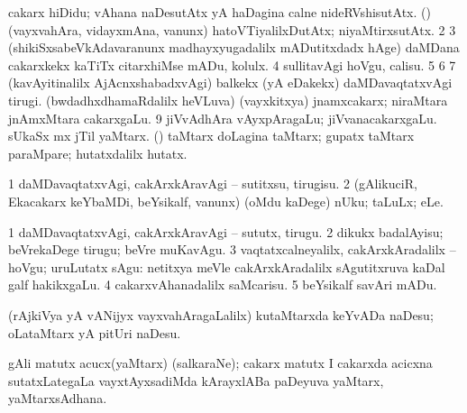 {{{{{{\noindent 
\gl{\pagu}
\expl{}
\bmng
\bnum
{}  
\banum
{} cakarx hiDidu; vAhana naDesutAtx yA haDagina calne nideRVshisutAtx. 
 (\rUpa) (vayxvahAra, vidayxmAna, \mo vanunx) hatoVTiyalilxDutAtx; niyaMtirxsutAtx. 
\eanum
\numie
\num{2}  
\num{3}  (shikiSxsabeVkAdavaranunx madhayxyugadalilx mADutitxdadx hAge) daMDana cakarxkekx kaTiTx citarxhiMse mADu, kolulx. 
\num{4}  sullitavAgi hoVgu, calisu. 
\num{5}  
\num{6}  
\num{7}  (kavAyitinalilx AjAcnxshabadxvAgi) balkekx (yA eDakekx) daMDavaqtatxvAgi tirugi. 
  
\banum
{}  
 (bwdadhxdhamaRdalilx heVLuva) (vayxkitxya) jnamxcakarx; niraMtara jnAmxMtara cakarxgaLu. 
\eanum
\numie
\num{9}  jiVvAdhAra vAyxpAragaLu; jiVvanacakarxgaLu. 
\hypertarget{wheel(1) pagu(10)}{} 
\banum
{} sUkaSx mx jTil yaMtarx. 
 (\AmA) taMtarx doLagina taMtarx; gupatx taMtarx paraMpare; hutatxdalilx hutatx. 
\eanum
\numie
\enum
\emng
\eentry

\bentry
{}
\gl{\sakirx}
\expl{}
\bmng
\bnum
\num{1} daMDavaqtatxvAgi, cakArxkAravAgi -- sutitxsu, tirugisu. 
\num{2} (gAlikuciR, Ekacakarx keYbaMDi, beYsikalf, \mo vanunx) (oMdu kaDege) nUku; taLuLx; eLe. 
\enum
\emng

\noindent 
\gl{\akirx}
\expl{}
\bmng
\bnum
\num{1} daMDavaqtatxvAgi, cakArxkAravAgi -- sututx, tirugu. 
\num{2} dikukx badalAyisu; beVrekaDege tirugu; beVre muKavAgu. 
\num{3} vaqtatxcalneyalilx, cakArxkAradalilx -- hoVgu; uruLutatx sAgu:  netitxya meVle cakArxkAradalilx sAgutitxruva kaDal galf hakikxgaLu. 
\num{4} cakarxvAhanadalilx saMcarisu. 
\num{5} beYsikalf savAri mADu. 
\enum
\emng
\eentry

\bentry 
{} 
\gl{\sakirx}
\expl{}
\bmng
(rAjkiVya yA vANijyx vayxvahAragaLalilx) kutaMtarxda keYvADa naDesu; oLataMtarx yA pitUri naDesu. 
\emng
\eentry

\bentry
{} 
\gl{\nA}
\expl{}
\bmng
gAli matutx acucx(yaMtarx) (salkaraNe); cakarx matutx I cakarxda acicxna sutatxLategaLa vayxtAyxsadiMda kArayxlABa paDeyuva yaMtarx, yaMtarxsAdhana. 
\emng
\eentry

}}}}}}
